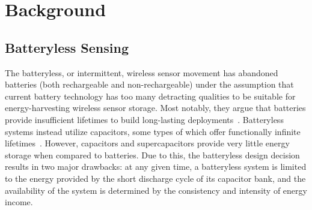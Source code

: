 \chapter{Background}


\section{Batteryless Sensing}

The batteryless, or intermittent, wireless sensor movement has abandoned batteries (both rechargeable and non-rechargeable) under the assumption that current battery technology has too many detracting qualities to be suitable for energy-harvesting wireless sensor storage.
Most notably, they argue that batteries provide insufficient lifetimes to build long-lasting deployments~\cite{hesterTragedy15, hesterFlicker17, hesterTimely17, hester2017future, colinReconfigurable18, luciaIntermittent17, yervaGrafting12, majid2020continuous}.
Batteryless systems instead utilize capacitors, some types of which offer functionally infinite lifetimes~\cite{kemetLife}.
However, capacitors and supercapacitors provide very little energy storage when compared to batteries.
Due to this, the batteryless design decision results in two major drawbacks: 
at any given time, a batteryless system is limited to the energy provided by the short discharge cycle of its capacitor bank, 
and the availability of the system is determined by the consistency and intensity of energy income. 

